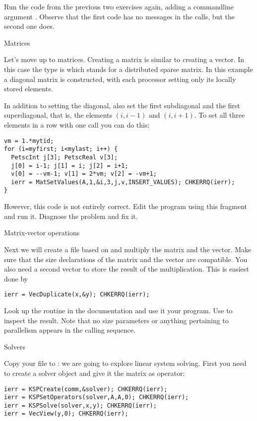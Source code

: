 Run the code from the previous two exercises again, adding a
commandline argument . Observe that the first code has
no messages in the  calls, but the second one
does.

 {Matrices}

Let's move up to matrices. Creating a matrix is similar to creating a
vector. In this case the type is  which stands for a
distributed sparse matrix.
In this example a diagonal matrix is constructed, with each processor
setting only its locally stored elements.

\begin{exercise}
  In addition to setting the diagonal, also set the first
  subdiagonal and the first superdiagonal, that is, the elements
  $(i,i-1)$ and $(i,i+1)$. To set all three elements in a row with one
  call you can do this:
\begin{verbatim}
vm = 1.*mytid;
for (i=myfirst; i<mylast; i++) {
  PetscInt j[3]; PetscReal v[3];
  j[0] = i-1; j[1] = i; j[2] = i+1;
  v[0] = --vm-1; v[1] = 2*vm; v[2] = -vm+1;
  ierr = MatSetValues(A,1,&i,3,j,v,INSERT_VALUES); CHKERRQ(ierr);
}
\end{verbatim}
However, this code is not entirely correct. Edit the program using
this fragment and run it. Diagnose the problem and fix it.
\end{exercise}

 {Matrix-vector operations}

Next we will create a file  based on  and multiply the
matrix and the vector. Make sure that the size declarations
of the matrix and the vector are compatible. You also need a second
vector to store the result of the multiplication. This is easiest done
by
\begin{verbatim}
ierr = VecDuplicate(x,&y); CHKERRQ(ierr);
\end{verbatim}

\begin{exercise}
  Look up the  routine in the documentation and use it your
  program. Use  to inspect the result. Note that no size
  parameters or anything pertaining to parallelism appears in the
  calling sequence.
\end{exercise}

 {Solvers}

Copy your  file to : we are going to explore linear
system solving.
First you need to create a solver object and give
it the matrix as operator:
\begin{verbatim}
ierr = KSPCreate(comm,&solver); CHKERRQ(ierr);
ierr = KSPSetOperators(solver,A,A,0); CHKERRQ(ierr);
ierr = KSPSolve(solver,x,y); CHKERRQ(ierr);
ierr = VecView(y,0); CHKERRQ(ierr);
\end{verbatim}

